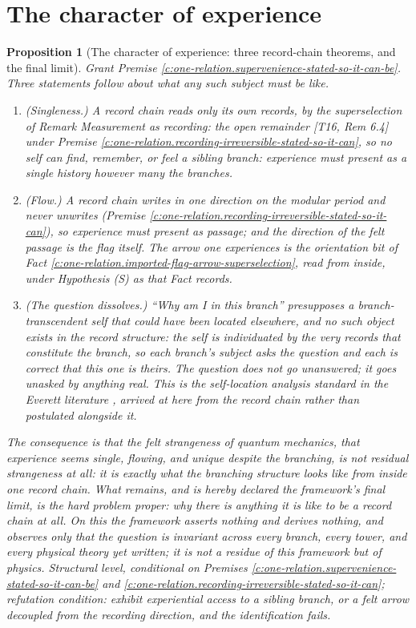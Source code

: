 \documentclass[11pt]{article}
\newtheorem{proposition}[theorem]{Proposition}
\theoremstyle{definition}
\theoremstyle{plain}
\newcommand{\changedmark}[2]{\marginpar{\raggedright\scriptsize\color{#1}#2}}
\begin{document}
\section{The character of experience}

\begin{proposition}[The character of experience: three record-chain theorems, and the final limit]\label{c:one-relation.character-experience-three-record-chain-theorems}
\changedmark{gray}{reworded}
Grant Premise \ref{c:one-relation.supervenience-stated-so-it-can-be}. Three statements follow about what any such subject must be like.
\begin{enumerate}
\item \emph{(Singleness.)} A record chain reads only its own records, by the superselection of Remark \emph{Measurement as recording: the open remainder} [T16, Rem 6.4] under Premise \ref{c:one-relation.recording-irreversible-stated-so-it-can}, so no self can find, remember, or feel a sibling branch: experience must present as a single history however many the branches.
\item \emph{(Flow.)} A record chain writes in one direction on the modular period and never unwrites (Premise \ref{c:one-relation.recording-irreversible-stated-so-it-can}), so experience must present as passage; and the direction of the felt passage is the flag itself. The arrow one experiences is the orientation bit of Fact \ref{c:one-relation.imported-flag-arrow-superselection}, read from inside, under Hypothesis (S) as that Fact records.
\item \emph{(The question dissolves.)} ``Why am I in this branch'' presupposes a branch-transcendent self that could have been located elsewhere, and no such object exists in the record structure: the self is individuated by the very records that constitute the branch, so each branch's subject asks the question and each is correct that this one is theirs. The question does not go unanswered; it goes unasked by anything real. This is the self-location analysis standard in the Everett literature \cite{Saunders2010, Wallace2012}, arrived at here from the record chain rather than postulated alongside it.
\end{enumerate}
The consequence is that the felt strangeness of quantum mechanics, that experience seems single, flowing, and unique despite the branching, is not residual strangeness at all: it is exactly what the branching structure looks like from inside one record chain. What remains, and is hereby declared the framework's final limit, is the hard problem proper: why there is anything it is like to be a record chain at all. On this the framework asserts nothing and derives nothing, and observes only that the question is invariant across every branch, every tower, and every physical theory yet written; it is not a residue of this framework but of physics. Structural level, conditional on Premises \ref{c:one-relation.supervenience-stated-so-it-can-be} and \ref{c:one-relation.recording-irreversible-stated-so-it-can}; refutation condition: exhibit experiential access to a sibling branch, or a felt arrow decoupled from the recording direction, and the identification fails.
\end{proposition}
\end{document}
